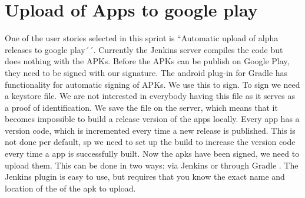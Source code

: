 \chapter{Upload of Apps to google play}
One of the user stories selected in this sprint is ``Automatic upload of alpha releases to google play´´. Currently the Jenkins server compiles the code but does nothing with the APKs. Before the APKs can be publish on Google Play, they need to be signed with our signature. The android plug-in for Gradle has functionality for automatic signing of APKs. We use this to sign. To sign we need a keystore file. We are not interested in everybody having this file as it serves as a proof of identification. We save the file on the server, which means that it becomes impossible to build a release version of the apps locally.
Every app has a version code, which is incremented every time a new release is published. This is not done per default, sp we need to set up the build to increase the version code every time a app is successfully built. 
Now the apks have been signed, we need to upload them. This can be done in two ways: via Jenkins \parencite{jenkins-play-plugin} or through Gradle \parencite{gradle-play-plugin}. The Jenkins plugin is easy to use, but requires that you know the exact name and location of the of the apk to upload.